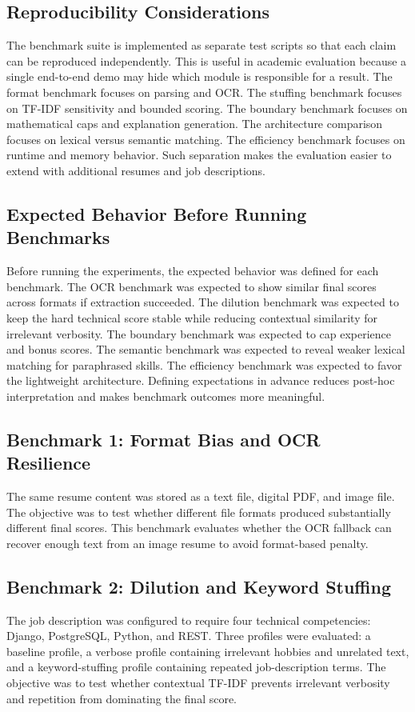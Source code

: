 \documentclass[conference]{IEEEtran}
\begin{document}
\subsection{Reproducibility Considerations}
The benchmark suite is implemented as separate test scripts so that each claim can be reproduced independently. This is useful in academic evaluation because a single end-to-end demo may hide which module is responsible for a result. The format benchmark focuses on parsing and OCR. The stuffing benchmark focuses on TF-IDF sensitivity and bounded scoring. The boundary benchmark focuses on mathematical caps and explanation generation. The architecture comparison focuses on lexical versus semantic matching. The efficiency benchmark focuses on runtime and memory behavior. Such separation makes the evaluation easier to extend with additional resumes and job descriptions.

\subsection{Expected Behavior Before Running Benchmarks}
Before running the experiments, the expected behavior was defined for each benchmark. The OCR benchmark was expected to show similar final scores across formats if extraction succeeded. The dilution benchmark was expected to keep the hard technical score stable while reducing contextual similarity for irrelevant verbosity. The boundary benchmark was expected to cap experience and bonus scores. The semantic benchmark was expected to reveal weaker lexical matching for paraphrased skills. The efficiency benchmark was expected to favor the lightweight architecture. Defining expectations in advance reduces post-hoc interpretation and makes benchmark outcomes more meaningful.

\subsection{Benchmark 1: Format Bias and OCR Resilience}
The same resume content was stored as a text file, digital PDF, and image file. The objective was to test whether different file formats produced substantially different final scores. This benchmark evaluates whether the OCR fallback can recover enough text from an image resume to avoid format-based penalty.

\subsection{Benchmark 2: Dilution and Keyword Stuffing}
The job description was configured to require four technical competencies: Django, PostgreSQL, Python, and REST. Three profiles were evaluated: a baseline profile, a verbose profile containing irrelevant hobbies and unrelated text, and a keyword-stuffing profile containing repeated job-description terms. The objective was to test whether contextual TF-IDF prevents irrelevant verbosity and repetition from dominating the final score.
\end{document}
